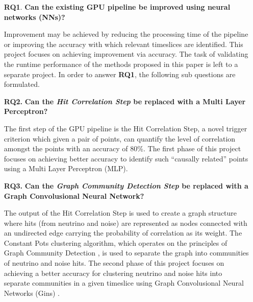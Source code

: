 \begin{enumerate}
  \item[\textbf{RQ1}.] \textbf{Can the existing GPU pipeline be improved using neural networks (NNs)?}

    Improvement may be achieved by reducing the processing time of the
    pipeline or improving the accuracy with which relevant timeslices
    are identified. This project focuses on achieving improvement via
    accuracy. The task of validating the runtime performance of the
    methods proposed in this paper is left to a separate project. In
    order to answer \textbf{RQ1}, the following sub questions are
    formulated.

  \item[\textbf{RQ2.}] \textbf{Can the \emph{Hit Correlation Step} be replaced with a Multi Layer Perceptron?}

    The first step of the GPU pipeline is the Hit Correlation Step, a
    novel trigger criterion which given a pair of points, can quantify
    the level of correlation amongst the points with an accuracy of
    80\%. The first phase of this project focuses on achieving better
    accuracy to identify such ``causally related'' points using a
    Multi Layer Perceptron (MLP).
    
  \item[\textbf{RQ3.}] \textbf{Can the \emph{Graph Community Detection Step} be replaced with a Graph Convolusional Neural Network?}

    The output of the Hit Correlation Step is used to create a graph
    structure where hits (from neutrino and noise) are represented as
    nodes connected with an undirected edge carrying the probability
    of correlation as its weight. The Constant Pots clustering
    algorithm, which operates on the principles of Graph Community
    Detection \cite{fortunato2010community}, is used to separate the
    graph into communities of neutrino and noise hits. The second
    phase of this project focuses on achieving a better accuracy for
    clustering neutrino and noise hits into separate communities in a
    given timeslice using Graph Convolusional Neural Networks (Gins)
    \cite{kipf2016semi}.
\end{enumerate}

